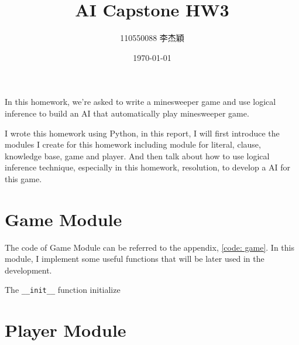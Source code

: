 \documentclass[twocolumn]{extarticle}
\title{AI Capstone HW3}
\author{110550088 李杰穎}
\date{\today}
\begin{document}
\maketitle

In this homework, we're asked to write a minesweeper game and use logical inference to build an AI that automatically play minesweeper game.

I wrote this homework using Python, in this report, I will first introduce the modules I create for this homework including module for literal, clause, knowledge base, game and player. And then talk about how to use logical inference technique, especially in this homework, resolution, to develop a AI for this game. 

\section{Game Module}

The code of Game Module can be referred to the appendix, \autoref{code: game}. In this module, I implement some useful functions that will be later used in the development. 

The \texttt{\_\_init\_\_} function initialize 

\section{Player Module}
\end{document}
